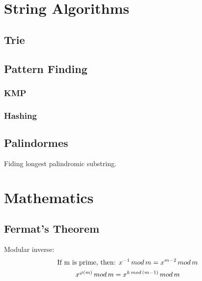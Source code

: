\documentclass[13pt]{article}
\begin{document}
\section{String Algorithms}

\subsection{Trie}\label{sub:trie} %


\subsection{Pattern Finding}\label{sub:pattern_finding} %

\subsubsection{KMP}\label{ssub:kmp} %


\subsubsection{Hashing}\label{ssub:hashing} %




\pagebreak

\subsection{Palindormes}\label{sub:pal} %
Fiding longest palindromic substring.


\section{Mathematics}

\subsection{Fermat's Theorem}\label{sub:fermat_s_theorem} %
Modular inverse:
\[
	\text{If m is prime, then: } \Huge x^{-1}\,mod\,m = x^{m-2}\,mod\,m
\]
\[
	\Huge	x^{\varphi(m)}\,mod\,m = x^{k\,mod\,(m-1)}\,mod\,m
\]

\end{document}
